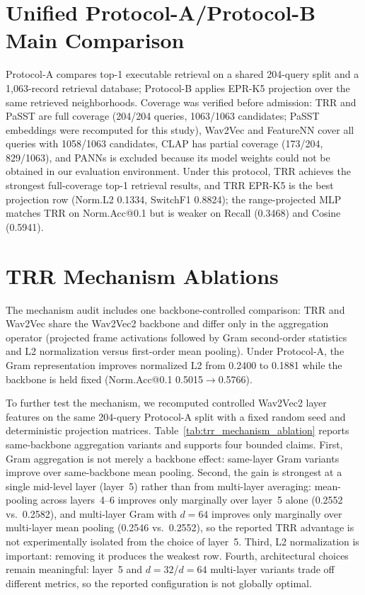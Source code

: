 \documentclass[journal,10pt]{IEEEtran}
\begin{document}
\section{Unified Protocol-A/Protocol-B Main Comparison}

Protocol-A compares top-1 executable retrieval on a shared 204-query split and a 1,063-record retrieval database; Protocol-B applies EPR-K5 projection over the same retrieved neighborhoods. Coverage was verified before admission: TRR and PaSST are full coverage (204/204 queries, 1063/1063 candidates; PaSST embeddings were recomputed for this study), Wav2Vec and FeatureNN cover all queries with 1058/1063 candidates, CLAP has partial coverage (173/204, 829/1063), and PANNs is excluded because its model weights could not be obtained in our evaluation environment. Under this protocol, TRR achieves the strongest full-coverage top-1 retrieval results, and TRR EPR-K5 is the best projection row (Norm.L2 0.1334, SwitchF1 0.8824); the range-projected MLP matches TRR on Norm.Acc@0.1 but is weaker on Recall (0.3468) and Cosine (0.5941).

\section{TRR Mechanism Ablations}

The mechanism audit includes one backbone-controlled comparison: TRR and Wav2Vec share the Wav2Vec2 backbone and differ only in the aggregation operator (projected frame activations followed by Gram second-order statistics and L2 normalization versus first-order mean pooling). Under Protocol-A, the Gram representation improves normalized L2 from 0.2400 to 0.1881 while the backbone is held fixed (Norm.Acc@0.1 0.5015$\rightarrow$0.5766).

To further test the mechanism, we recomputed controlled Wav2Vec2 layer features on the same 204-query Protocol-A split with a fixed random seed and deterministic projection matrices. Table~\ref{tab:trr_mechanism_ablation} reports same-backbone aggregation variants and supports four bounded claims. First, Gram aggregation is not merely a backbone effect: same-layer Gram variants improve over same-backbone mean pooling. Second, the gain is strongest at a single mid-level layer (layer~5) rather than from multi-layer averaging: mean-pooling across layers~4--6 improves only marginally over layer~5 alone (0.2552 vs.\ 0.2582), and multi-layer Gram with $d=64$ improves only marginally over multi-layer mean pooling (0.2546 vs.\ 0.2552), so the reported TRR advantage is not experimentally isolated from the choice of layer~5. Third, L2 normalization is important: removing it produces the weakest row. Fourth, architectural choices remain meaningful: layer~5 and $d=32$/$d=64$ multi-layer variants trade off different metrics, so the reported configuration is not globally optimal.
\end{document}
